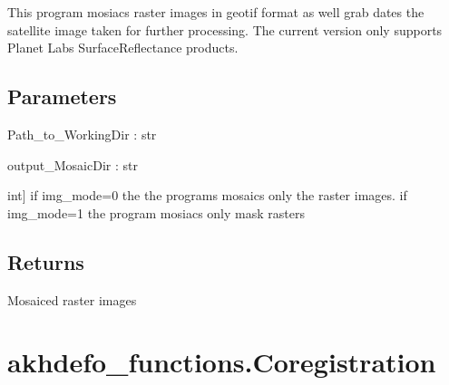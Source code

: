 \documentclass[letterpaper,10pt]{sphinxmanual}
\begin{document}
\begin{fulllineitems}
\label{\detokenize{generated/akhdefo_functions.Mosaic:akhdefo_functions.Mosaic}}
\pysigstartsignatures
{}
\pysigstopsignatures
\sphinxAtStartPar
This program mosiacs raster images in geotif format as well grab dates the satellite image taken for further processing. 
The current version only supports Planet Labs SurfaceReflectance products.


\section{Parameters}
\label{\detokenize{generated/akhdefo_functions.Mosaic:parameters}}
\sphinxAtStartPar
Path\_to\_WorkingDir : str

\sphinxAtStartPar
output\_MosaicDir : str
\begin{description}
\sphinxlineitem{img\_mode}{[}int{]}
\sphinxAtStartPar
if img\_mode=0 the the programs mosaics only the raster images. 
if img\_mode=1 the program mosiacs only mask rasters

\end{description}


\section{Returns}
\label{\detokenize{generated/akhdefo_functions.Mosaic:returns}}
\sphinxAtStartPar
Mosaiced raster images

\end{fulllineitems}


\sphinxstepscope


\chapter{akhdefo\_functions.Coregistration}
\label{\detokenize{generated/akhdefo_functions.Coregistration:akhdefo-functions-coregistration}}\label{\detokenize{generated/akhdefo_functions.Coregistration::doc}}
\end{document}
